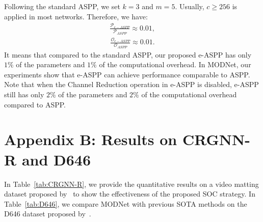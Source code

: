 \documentclass[letterpaper]{article} \usepackage{aaai22}  \usepackage{times}  \usepackage{helvet}  \usepackage{courier}  \usepackage[hyphens]{url}  \usepackage{graphicx} \urlstyle{rm} \def\UrlFont{\rm}  \usepackage{natbib}  \usepackage{caption} \usepackage{booktabs}
\begin{document}
Following the standard ASPP, we set $k = 3$ and $m = 5$. Usually, $c \geq 256$ is applied in most networks. Therefore, we have:
\begin{equation}
\begin{split}
        \frac{\mathcal{P}_{e-ASPP}}{\mathcal{P}_{ASPP}} \approx 0.01,
\end{split}
\end{equation}
\begin{equation}
\begin{split}
        \frac{\mathcal{O}_{e-ASPP}}{\mathcal{O}_{ASPP}} \approx 0.01.
\end{split}
\end{equation}
It means that compared to the standard ASPP, our proposed e-ASPP
has only $1\%$ of the parameters and $1\%$ of the computational
overhead. In MODNet, our experiments show that e-ASPP
can achieve performance comparable to ASPP.
Note that when the Channel Reduction operation in e-ASPP is disabled, e-ASPP still has only $2\%$ of the parameters and $2\%$ of the computational overhead compared to ASPP.

\section*{Appendix B: Results on CRGNN-R and D646}
In Table~\ref{tab:CRGNN-R}, we provide the quantitative results on a video matting dataset proposed by~\cite{CRGNN} to show the effectiveness of the proposed SOC strategy. In Table~\ref{tab:D646}, we compare MODNet with previous SOTA methods on the D646 dataset proposed by~\cite{HAtt}. 

\end{document}
